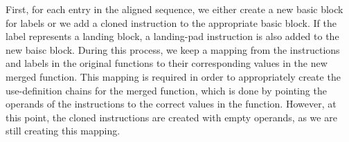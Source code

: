 %
%
%         
%

First, for each entry in the aligned sequence, we either create a new basic
block for labels or we add a cloned instruction to the appropriate basic
block.
If the label represents a landing block, a landing-pad instruction is also added
to the new baisc block.
During this process, we keep a mapping from the instructions and labels in the
original functions to their corresponding values in the new merged function.
This mapping is required in order to appropriately create the use-definition
chains for the merged function, which is done by pointing the operands of the
instructions to the correct values in the function.
However, at this point, the cloned instructions are created with empty operands,
as we are still creating this mapping.

